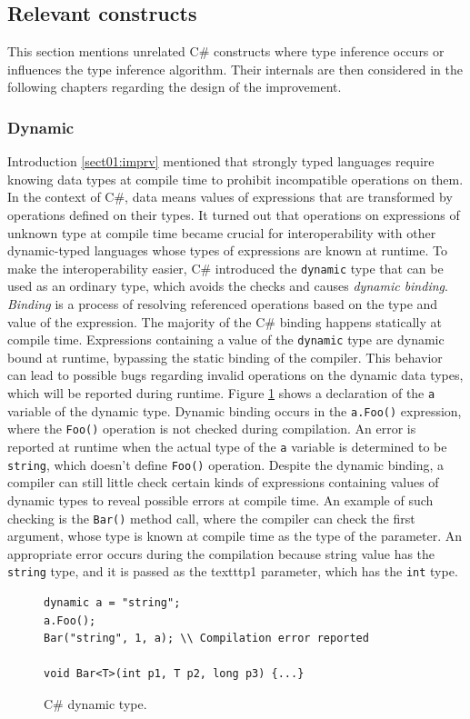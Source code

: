\subsection{Relevant constructs}

This section mentions unrelated C\# constructs where type inference occurs or influences the type inference algorithm.
Their internals are then considered in the following chapters regarding the design of the improvement.

\subsubsection*{Dynamic}

Introduction \ref{sect01:imprv} mentioned that strongly typed languages require knowing data types at compile time to prohibit incompatible operations on them. 
In the context of C\#, data means values of expressions that are transformed by operations defined on their types. 
It turned out that operations on expressions of unknown type at compile time became crucial for interoperability with other dynamic-typed languages whose types of expressions are known at runtime. 
To make the interoperability easier, C\# introduced the \texttt{dynamic} type that can be used as an ordinary type, which avoids the checks and causes \textit{dynamic binding}. 
\textit{Binding} is a process of resolving referenced operations based on the type and value of the expression. 
The majority of the C\# binding happens statically at compile time. Expressions containing a value of the \texttt{dynamic} type are dynamic bound at runtime, bypassing the static binding of the compiler. 
This behavior can lead to possible bugs regarding invalid operations on the dynamic data types, which will be reported during runtime. 
Figure \ref{img06:dynamic} shows a declaration of the \texttt{a} variable of the dynamic type.
Dynamic binding occurs in the \texttt{a.Foo()} expression, where the \texttt{Foo()} operation is not checked during compilation. 
An error is reported at runtime when the actual type of the \texttt{a} variable is determined to be \texttt{string}, which doesn’t define \texttt{Foo()} operation. Despite the dynamic binding, a compiler can still little check certain kinds of expressions containing values of dynamic types to reveal possible errors at compile time. 
An example of such checking is the \texttt{Bar()} method call, where the compiler can check the first argument, whose type is known at compile time as the type of the parameter. 
An appropriate error occurs during the compilation because string value has the \texttt{string} type, and it is passed as the texttt{p1} parameter, which has the \texttt{int} type.
\begin{figure}[h]
\begin{lstlisting}[style=csharp]
dynamic a = "string";
a.Foo();
Bar("string", 1, a); \\ Compilation error reported

void Bar<T>(int p1, T p2, long p3) {...}
\end{lstlisting}
\caption{C\# dynamic type.}
\label{img06:dynamic}
\end{figure}


